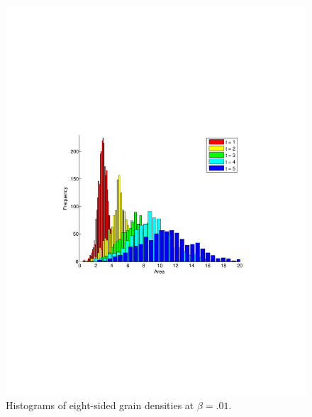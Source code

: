 \begin{figure}
\includegraphics[width=\textwidth]{histbetazerotier8.pdf}
\vspace{-130pt}
\caption{Histograms of eight-sided grain densities at $\beta = .01$.}
\end{figure}

